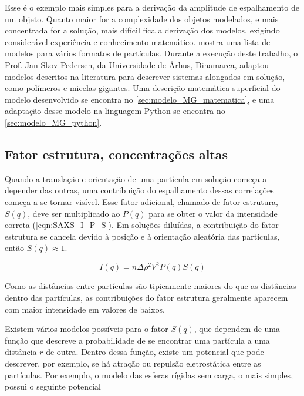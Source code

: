 		Esse é o exemplo mais simples para a derivação da amplitude de espalhamento de um objeto. Quanto maior for a complexidade dos objetos modelados, e mais concentrada for a solução, mais difícil fica a derivação dos modelos, exigindo considerável experiência e conhecimento matemático. \citeauthor{Pedersen1997b} mostra uma lista de modelos para vários formatos de partículas. Durante a execução deste trabalho, o Prof. Jan Skov Pedersen, da Universidade de \AA rhus, Dinamarca, adaptou modelos descritos na literatura para descrever sistemas alongados em solução, como polímeros e micelas gigantes. Uma descrição matemática superficial do modelo desenvolvido se encontra no \autoref{sec:modelo_MG_matematica}, e uma adaptação desse modelo na linguagem Python se encontra no \autoref{sec:modelo_MG_python}.
		
		\subsection{Fator estrutura, concentrações altas} 
		
		Quando a translação e orientação de uma partícula em solução começa a depender das outras, uma contribuição do espalhamento dessas correlações começa a se tornar visível. Esse fator adicional, chamado de fator estrutura, \(S(q)\), deve ser multiplicado ao \(P(q)\) para se obter o valor da intensidade correta (\autoref{eqn:SAXS_I_P_S}). Em soluções diluídas, a contribuição do fator estrutura se cancela devido à posição e à orientação aleatória das partículas, então \(S(q) \approx 1\).\cite{Narayanan2008a}
		
		\begin{equation}
			I(q) = n\Delta \rho^2 V^2 P(q) S(q)
			\label{eqn:SAXS_I_P_S}
		\end{equation}
		
		Como as distâncias entre partículas são tipicamente maiores do que as distâncias dentro das partículas, as contribuições do fator estrutura geralmente aparecem com maior intensidade em valores de \q{} baixos.\cite{Glatter2018livro}
		
		Existem vários modelos possíveis para o fator \(S(q)\), que dependem de uma função que descreve a probabilidade de se encontrar uma partícula a uma distância \(r\) de outra. Dentro dessa função, existe um potencial que pode descrever, por exemplo, se há atração ou repulsão eletrostática entre as partículas. Por exemplo, o modelo das esferas rígidas sem carga, o mais simples, possui o seguinte potencial \cite{Glatter2018livro}
		
